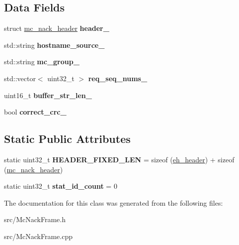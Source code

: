\subsection*{Data Fields}
\begin{DoxyCompactItemize}
\item 
\hypertarget{classMcNackFrame_ad9240ce205a11535c6662039c079d3f6}{struct \hyperlink{structmc__nack__header}{mc\-\_\-nack\-\_\-header} {\bfseries header\-\_\-}}\label{classMcNackFrame_ad9240ce205a11535c6662039c079d3f6}

\item 
\hypertarget{classMcNackFrame_a01a0eea1fae23d9ea9f55934eeba0e83}{std\-::string {\bfseries hostname\-\_\-source\-\_\-}}\label{classMcNackFrame_a01a0eea1fae23d9ea9f55934eeba0e83}

\item 
\hypertarget{classMcNackFrame_a2526645198d5b6ed3668569be36e3924}{std\-::string {\bfseries mc\-\_\-group\-\_\-}}\label{classMcNackFrame_a2526645198d5b6ed3668569be36e3924}

\item 
\hypertarget{classMcNackFrame_a77e39cb742f49a02beb8089a94985336}{std\-::vector$<$ uint32\-\_\-t $>$ {\bfseries req\-\_\-seq\-\_\-nums\-\_\-}}\label{classMcNackFrame_a77e39cb742f49a02beb8089a94985336}

\item 
\hypertarget{classMcNackFrame_a99de98d91b58204785c3d3eb870dc569}{uint16\-\_\-t {\bfseries buffer\-\_\-str\-\_\-len\-\_\-}}\label{classMcNackFrame_a99de98d91b58204785c3d3eb870dc569}

\item 
\hypertarget{classMcNackFrame_a22a482caf9eedb57b67acfbd47a1b20e}{bool {\bfseries correct\-\_\-crc\-\_\-}}\label{classMcNackFrame_a22a482caf9eedb57b67acfbd47a1b20e}

\end{DoxyCompactItemize}
\subsection*{Static Public Attributes}
\begin{DoxyCompactItemize}
\item 
\hypertarget{classMcNackFrame_a65cd268403fbd386df06dc83ae38a34b}{static uint32\-\_\-t {\bfseries H\-E\-A\-D\-E\-R\-\_\-\-F\-I\-X\-E\-D\-\_\-\-L\-E\-N} = sizeof (\hyperlink{structeh__header}{eh\-\_\-header}) + sizeof (\hyperlink{structmc__nack__header}{mc\-\_\-nack\-\_\-header})}\label{classMcNackFrame_a65cd268403fbd386df06dc83ae38a34b}

\item 
\hypertarget{classMcNackFrame_aac54da745331453c3c3c629df8764dc8}{static uint32\-\_\-t {\bfseries stat\-\_\-id\-\_\-count} = 0}\label{classMcNackFrame_aac54da745331453c3c3c629df8764dc8}

\end{DoxyCompactItemize}


The documentation for this class was generated from the following files\-:\begin{DoxyCompactItemize}
\item 
src/Mc\-Nack\-Frame.\-h\item 
src/Mc\-Nack\-Frame.\-cpp\end{DoxyCompactItemize}
